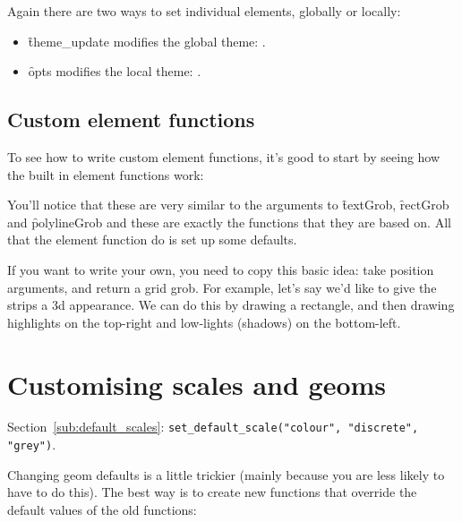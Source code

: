 Again there are two ways to set individual elements, globally or locally:

\begin{itemize}
  \item \f{theme_update} modifies the global theme: .
  
  \item \f{opts} modifies the local theme: .
  
\end{itemize}

% 
% 

\subsection{Custom element functions}

To see how to write custom element functions, it's good to start by seeing how the built in element functions work:

% 

You'll notice that these are very similar to the arguments to \f{textGrob}, \f{rectGrob} and \f{polylineGrob} and these are exactly the functions that they are based on.  All that the element function do is set up some defaults.  

If you want to write your own, you need to copy this basic idea: take position arguments, and return a grid grob.  For example, let's say we'd like to give the strips a 3d appearance.  We can do this by drawing a rectangle, and then drawing highlights on the top-right and low-lights (shadows) on the bottom-left.



\section{Customising scales and geoms}

Section~\ref{sub:default_scales}:  {\tt set_default_scale("colour", "discrete", "grey")}.

Changing geom defaults is a little trickier (mainly because you are less likely to have to do this).  The best way is to create new  functions that override the default values of the old functions:



